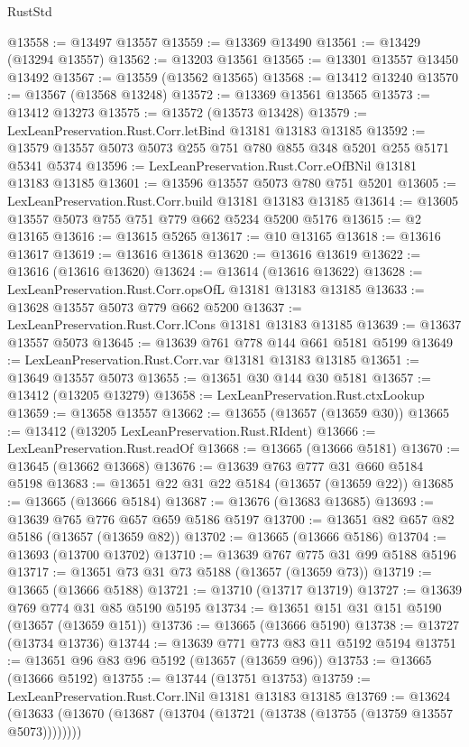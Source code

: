 \begin{lexlean}{RustStd}
\begin{coremodule}
@13558 := @13497 @13557
@13559 := @13369 @13490
@13561 := @13429 (@13294 @13557)
@13562 := @13203 @13561
@13565 := @13301 @13557 @13450 @13492
@13567 := @13559 (@13562 @13565)
@13568 := @13412 @13240
@13570 := @13567 (@13568 @13248)
@13572 := @13369 @13561 @13565
@13573 := @13412 @13273
@13575 := @13572 (@13573 @13428)
@13579 := LexLeanPreservation.Rust.Corr.letBind @13181 @13183 @13185
@13592 := @13579 @13557 @5073 @5073 @255 @751 @780 @855 @348 @5201 @255 @5171 @5341 @5374
@13596 := LexLeanPreservation.Rust.Corr.eOfBNil @13181 @13183 @13185
@13601 := @13596 @13557 @5073 @780 @751 @5201
@13605 := LexLeanPreservation.Rust.Corr.build @13181 @13183 @13185
@13614 := @13605 @13557 @5073 @755 @751 @779 @662 @5234 @5200 @5176
@13615 := @2 @13165
@13616 := @13615 @5265
@13617 := @10 @13165
@13618 := @13616 @13617
@13619 := @13616 @13618
@13620 := @13616 @13619
@13622 := @13616 (@13616 @13620)
@13624 := @13614 (@13616 @13622)
@13628 := LexLeanPreservation.Rust.Corr.opsOfL @13181 @13183 @13185
@13633 := @13628 @13557 @5073 @779 @662 @5200
@13637 := LexLeanPreservation.Rust.Corr.lCons @13181 @13183 @13185
@13639 := @13637 @13557 @5073
@13645 := @13639 @761 @778 @144 @661 @5181 @5199
@13649 := LexLeanPreservation.Rust.Corr.var @13181 @13183 @13185
@13651 := @13649 @13557 @5073
@13655 := @13651 @30 @144 @30 @5181
@13657 := @13412 (@13205 @13279)
@13658 := LexLeanPreservation.Rust.ctxLookup
@13659 := @13658 @13557
@13662 := @13655 (@13657 (@13659 @30))
@13665 := @13412 (@13205 LexLeanPreservation.Rust.RIdent)
@13666 := LexLeanPreservation.Rust.readOf
@13668 := @13665 (@13666 @5181)
@13670 := @13645 (@13662 @13668)
@13676 := @13639 @763 @777 @31 @660 @5184 @5198
@13683 := @13651 @22 @31 @22 @5184 (@13657 (@13659 @22))
@13685 := @13665 (@13666 @5184)
@13687 := @13676 (@13683 @13685)
@13693 := @13639 @765 @776 @657 @659 @5186 @5197
@13700 := @13651 @82 @657 @82 @5186 (@13657 (@13659 @82))
@13702 := @13665 (@13666 @5186)
@13704 := @13693 (@13700 @13702)
@13710 := @13639 @767 @775 @31 @99 @5188 @5196
@13717 := @13651 @73 @31 @73 @5188 (@13657 (@13659 @73))
@13719 := @13665 (@13666 @5188)
@13721 := @13710 (@13717 @13719)
@13727 := @13639 @769 @774 @31 @85 @5190 @5195
@13734 := @13651 @151 @31 @151 @5190 (@13657 (@13659 @151))
@13736 := @13665 (@13666 @5190)
@13738 := @13727 (@13734 @13736)
@13744 := @13639 @771 @773 @83 @11 @5192 @5194
@13751 := @13651 @96 @83 @96 @5192 (@13657 (@13659 @96))
@13753 := @13665 (@13666 @5192)
@13755 := @13744 (@13751 @13753)
@13759 := LexLeanPreservation.Rust.Corr.lNil @13181 @13183 @13185
@13769 := @13624
    (@13633 (@13670 (@13687 (@13704 (@13721 (@13738 (@13755 (@13759 @13557 @5073))))))))

\end{coremodule}
\end{lexlean}
